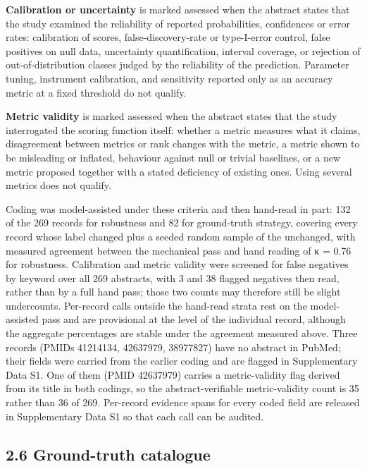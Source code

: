 \documentclass{article}
\begin{document}
\textbf{Calibration or uncertainty} is marked assessed when the abstract
states that the study examined the reliability of reported
probabilities, confidences or error rates: calibration of scores,
false-discovery-rate or type-I-error control, false positives on null
data, uncertainty quantification, interval coverage, or rejection of
out-of-distribution classes judged by the reliability of the prediction.
Parameter tuning, instrument calibration, and sensitivity reported only
as an accuracy metric at a fixed threshold do not qualify.

\textbf{Metric validity} is marked assessed when the abstract states
that the study interrogated the scoring function itself: whether a
metric measures what it claims, disagreement between metrics or rank
changes with the metric, a metric shown to be misleading or inflated,
behaviour against null or trivial baselines, or a new metric proposed
together with a stated deficiency of existing ones. Using several
metrics does not qualify.

Coding was model-assisted under these criteria and then hand-read in
part: 132 of the 269 records for robustness and 82 for ground-truth
strategy, covering every record whose label changed plus a seeded random
sample of the unchanged, with measured agreement between the mechanical
pass and hand reading of κ = 0.76 for robustness. Calibration and metric
validity were screened for false negatives by keyword over all 269
abstracts, with 3 and 38 flagged negatives then read, rather than by a
full hand pass; those two counts may therefore still be slight
undercounts. Per-record calls outside the hand-read strata rest on the
model-assisted pass and are provisional at the level of the individual
record, although the aggregate percentages are stable under the
agreement measured above. Three records (PMIDs 41214134, 42637979,
38977827) have no abstract in PubMed; their fields were carried from the
earlier coding and are flagged in Supplementary Data S1. One of them
(PMID 42637979) carries a metric-validity flag derived from its title in
both codings, so the abstract-verifiable metric-validity count is 35
rather than 36 of 269. Per-record evidence spans for every coded field
are released in Supplementary Data S1 so that each call can be audited.

\subsection{2.6 Ground-truth catalogue}\label{ground-truth-catalogue}
\end{document}
